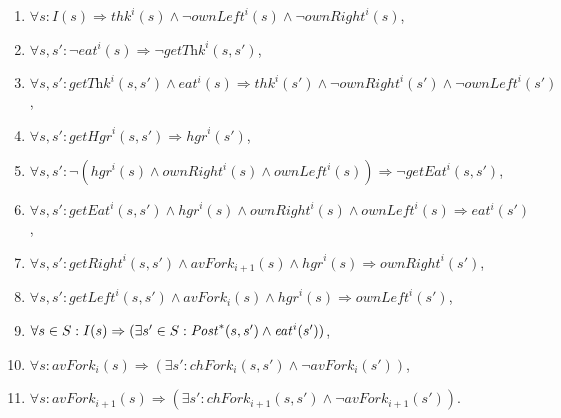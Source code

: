 \begin{enumerate}[(1)]
\item \label{phils-form-1} $\forall s : I(s) \Rightarrow \mathit{thk}^i(s) \wedge \neg \mathit{ownLeft}^i(s) \wedge \neg \mathit{ownRight}^i(s)$,
\item \label{phils-form-2}  $\forall s,s' : \neg \mathit{eat}^i(s) \Rightarrow \neg \textit{getThk}^i(s,s')$,
\item \label{phils-form-3} $\forall s,s' : \textit{getThk}^i(s,s') \wedge \mathit{eat}^i(s) \Rightarrow \mathit{thk}^i(s') \wedge \neg \mathit{ownRight}^i(s') \wedge \neg \mathit{ownLeft}^{i }(s') $,
\item  \label{phils-form-4} $\forall s,s': \textit{getHgr}^i(s,s') \Rightarrow \mathit{hgr}^i(s')$,
\item \label{phils-form-5} $\forall s, s':  \neg (\mathit{hgr}^i(s) \land \mathit{ownRight}^i(s) \land \mathit{ownLeft}^i(s)) \Rightarrow \neg \mathit{getEat}^i(s,s')$,
\item \label{phils-form-6} $\forall s,s': \textit{getEat}^i(s,s') \wedge \mathit{hgr}^i(s) \wedge \mathit{ownRight}^i(s) \wedge \mathit{ownLeft}^i(s) \Rightarrow \mathit{eat}^i(s')$,
\item \label{phils-form-7} $\forall s,s': \mathit{getRight}^i(s,s') \wedge \mathit{avFork}_{i+1}(s) \wedge \mathit{hgr}^i(s) \Rightarrow \mathit{ownRight}^i(s')$,
\item  \label{phils-form-8}$\forall s,s': \mathit{getLeft}^i(s,s') \wedge \mathit{avFork}_{i}(s) \wedge \mathit{hgr}^i(s) \Rightarrow \mathit{ownLeft}^i(s')$,
\item \label{phils-form-9}$\forall s \in S : I(s) \Rightarrow (\exists s' \in S: \mathit{Post}^*(s,s') \wedge \mathit{eat}^i(s'))$,
\item \label{phils-form-10}$\forall s :  \mathit{avFork}_i(s)  \Rightarrow (\exists s' : \mathit{chFork_{i}}(s,s') \wedge \neg \mathit{avFork}_i(s'))$,
\item \label{phils-form-11}$\forall s :  \mathit{avFork}_{i+1}(s)  \Rightarrow (\exists s' : \mathit{chFork_{i+1}}(s,s') \wedge \neg \mathit{avFork}_{i+1}(s'))$.
\end{enumerate}

